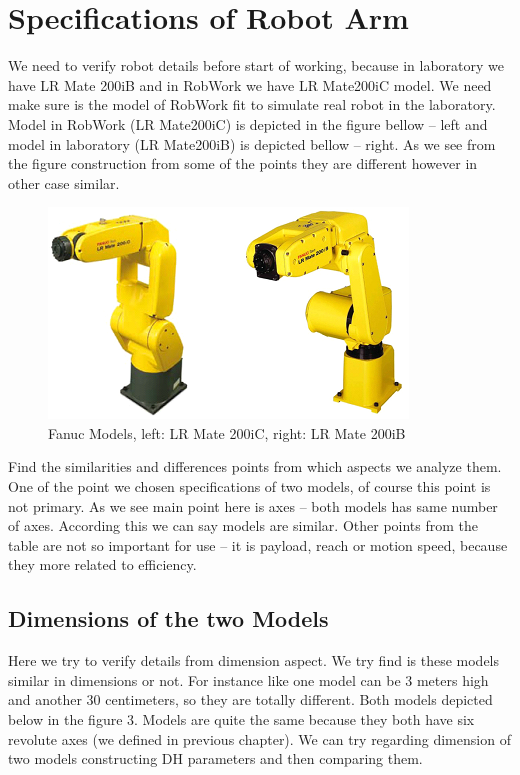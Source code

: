 \section{Specifications of Robot Arm}
\label{sec:spec}

We need to verify robot details before start of working, because in laboratory we have LR Mate 200iB and in RobWork we have LR Mate200iC model. We need make sure is the model of RobWork fit to simulate real robot in the laboratory. Model in RobWork (LR Mate200iC) is depicted in the figure bellow – left and model in laboratory (LR Mate200iB) is depicted bellow – right. As we see from the figure construction from some of the points they are different however in other case similar.

\begin{figure}[H]
  \centering
  \includegraphics[scale= 1]{source/fanucModelPhoto.png}
  \caption{Fanuc Models, left: LR Mate 200iC, right: LR Mate 200iB}
  \label{fig:FanucModels}
\end{figure}


Find the similarities and differences points from which aspects we analyze them. One of the point we chosen specifications of two models, of course this point is not primary. As we see main point here is axes – both models has same number of axes. According this we can say models are similar. Other points from the table are not so important for use – it is payload, reach or motion speed, because they more related to efficiency.

\subsection{Dimensions of the two Models}
Here we try to verify details from dimension aspect. We try find is these models similar in dimensions or not. For instance like one model can be 3 meters high and another 30 centimeters, so they are totally different.  Both models depicted below in the figure 3. Models are quite the same because they both have six revolute axes (we defined in previous chapter). We can try regarding dimension of two models constructing DH parameters and then comparing them.

